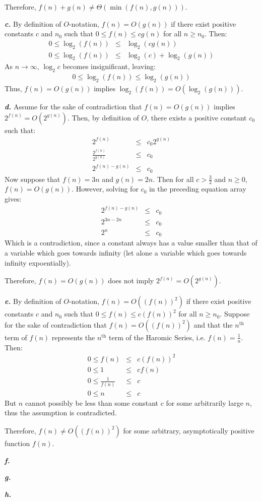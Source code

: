 \documentclass{article}
\begin{document}
Therefore, $f(n) + g(n) \neq \Theta(\min(f(n),g(n)))$.

\noindent\textbf{\textit{c.}} By definition of $O$-notation,  $f(n) = O(g(n))$ if there exist positive constants $c$ and $n_0$ such that $0 \leq f(n) \leq c g(n)$ for all $n \geq n_0$. Then:
\begin{eqnarray*}
	0 \leq \log_2(f(n)) & \leq & \log_2(c g(n)) \\
	0 \leq \log_2(f(n)) & \leq & \log_2(c) + \log_2(g(n))
\end{eqnarray*}
As $n \rightarrow \infty$, $\log_2 c$ becomes insignificant, leaving:
\begin{eqnarray*}
	0 \leq \log_2(f(n)) \leq \log_2(g(n))
\end{eqnarray*}
Thus, $f(n) = O(g(n))$ implies $\log_2(f(n)) = O(\log_2(g(n)))$.

\noindent\textbf{\textit{d.}} Assume for the sake of contradiction that $f(n) = O(g(n))$ implies $ 2^{f(n)} = O(2^{g(n)})$. Then, by definition of $O$, there exists a positive constant $c_0$ such that:
\begin{eqnarray*}
	2^{f(n)} & \leq & c_0 2^{g(n)} \\
	\frac{2^{f(n)}}{2^{g(n)}} & \leq & c_0 \\
	2^{f(n) - g(n)} & \leq & c_0
\end{eqnarray*}
Now suppose that $f(n) = 3n$ and $g(n) = 2n$. Then for all $c > \frac{3}{2}$ and $n \geq 0$, $f(n) = O(g(n))$. However, solving for $c_0$ in the preceding equation array gives:
\begin{eqnarray*}
	2^{f(n) - g(n)} & \leq & c_0 \\
	2^{3n - 2n} & \leq & c_0 \\
	2^n & \leq & c_0
\end{eqnarray*}
Which is a contradiction, since a constant always has a value smaller than that of a variable which goes towards infinity (let alone a variable which goes towards infinity expoentially).

Therefore, $f(n) = O(g(n))$ does not imply $2^{f(n)} = O(2^{g(n)})$.

\noindent\textbf{\textit{e.}} By definition of $O$-notation, $f(n) = O((f(n))^2)$ if there exist positive constants $c$ and $n_0$ such that $0 \leq f(n) \leq c (f(n))^2$ for all $n \geq n_0$. Suppose for the sake of contradiction that $f(n) = O((f(n))^2)$ and that the $n^{\text{th}}$ term of $f(n)$ represents the $n^{\text{th}}$ term of the Haromic Series, i.e. $f(n) = \frac{1}{n}$. Then:
\begin{eqnarray*}
	0 \leq f(n) & \leq & c (f(n))^2 \\
	0 \leq 1 & \leq & c f(n) \\
	0 \leq \frac{1}{f(n)} & \leq & c \\
	0 \leq n & \leq & c
\end{eqnarray*}
But $n$ cannot possibly be less than some constant $c$ for some arbitrarily large $n$, thus the assumption is contradicted.

Therefore, $f(n) \neq O((f(n))^2)$ for some arbitrary, asymptotically positive function $f(n)$.

\noindent\textbf{\textit{f.}}

\noindent\textbf{\textit{g.}}

\noindent\textbf{\textit{h.}}
\end{document}
